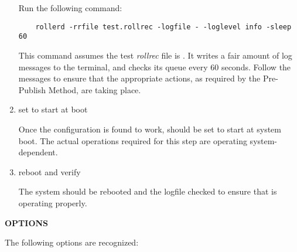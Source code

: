 \begin{enumerate}
Run the following command:

\begin{verbatim}
    rollerd -rrfile test.rollrec -logfile - -loglevel info -sleep 60
\end{verbatim}

This command assumes the test {\it rollrec} file is .  It
writes a fair amount of log messages to the terminal, and checks its queue
every 60 seconds.  Follow the messages to ensure that the appropriate actions,
as required by the Pre-Publish Method, are taking place.

\item set  to start at boot\verb" "

Once the configuration is found to work,  should be set to start
at system boot.  The actual operations required for this step are operating
system-dependent.

\item reboot and verify\verb" "

The system should be rebooted and the  logfile checked to ensure
that  is operating properly.

\end{enumerate}

{\bf OPTIONS}

The following options are recognized:

